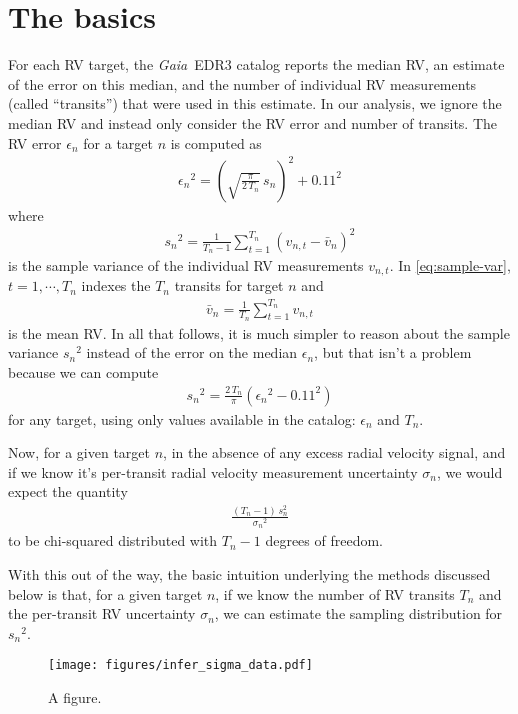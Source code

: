 \documentclass[modern, letterpaper]{aastex631}
\newcommand{\project}[1]{\textsl{#1}}
\newcommand{\Gaia}{\project{Gaia}}
\begin{document}
\section{The basics}

For each RV target, the \Gaia\ EDR3 catalog reports the median RV, an estimate of the error on this median, and the number of individual RV measurements (called ``transits'') that were used in this estimate.
In our analysis, we ignore the median RV and instead only consider the RV error and number of transits.
The RV error $\epsilon_n$ for a target $n$ is computed as \citep{Katz19}
\begin{eqnarray}
	{\epsilon_n}^2 = \left(\sqrt{\frac{\pi}{2\,T_n}}\,s_n\right)^2 + 0.11^2
\end{eqnarray}
where
\begin{eqnarray}
	\label{eq:sample-var}
	{s_n}^2 = \frac{1}{T_n-1}\sum_{t=1}^{T_n} \left(v_{n,t} - \bar{v}_n\right)^2
\end{eqnarray}
is the sample variance of the individual RV measurements $v_{n,t}$.
In \autoref{eq:sample-var}, $t=1,\cdots,T_n$ indexes the $T_n$ transits for target $n$ and
\begin{eqnarray}
	\bar{v}_n = \frac{1}{T_n}\sum_{t=1}^{T_n} v_{n,t}
\end{eqnarray}
is the mean RV.
In all that follows, it is much simpler to reason about the sample variance ${s_n}^2$ instead of the error on the median ${\epsilon}_n$, but that isn't a problem because we can compute
\begin{eqnarray}
	{s_n}^2 = \frac{2\,T_n}{\pi}\left({\epsilon_n}^2 - 0.11^2\right)
\end{eqnarray}
for any target, using only values available in the catalog: $\epsilon_n$ and $T_n$.

Now, for a given target $n$, in the absence of any excess radial velocity signal, and if we know it's per-transit radial velocity measurement uncertainty $\sigma_n$, we would expect the quantity
\begin{eqnarray}
	\frac{(T_n - 1)\,s_n^2}{{\sigma_n}^2}
\end{eqnarray}
to be chi-squared distributed with $T_n - 1$ degrees of freedom.

With this out of the way, the basic intuition underlying the methods discussed below is that, for a given target $n$, if we know the number of RV transits $T_n$ and the per-transit RV uncertainty $\sigma_n$, we can estimate the sampling distribution for ${s_n}^2$.

\begin{figure}
	\begin{centering}
		\texttt{[image: figures/infer\_sigma\_data.pdf]}
		\caption{A figure.}
		\label{fig:infer_sigma:data}
	\end{centering}
\end{figure}
\end{document}
